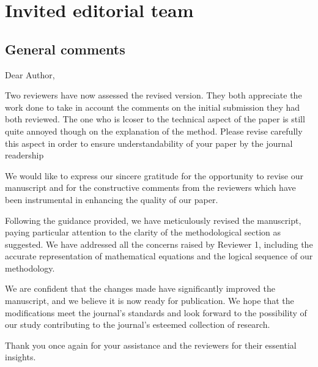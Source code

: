 \section*{Invited editorial team}\label{editor}

\subsection*{General comments}
\RC{} Dear Author,

\RC*{} Two reviewers have now assessed the revised version. They both appreciate the work done to take in account the comments on the initial submission they had both reviewed. The one who is lcoser to the technical aspect of the paper is still quite annoyed though on the explanation of the method. Please revise carefully this aspect in order to ensure understandability of your paper by the journal readership

\AR{} We would like to express our sincere gratitude for the opportunity to revise our manuscript and for the constructive comments from the reviewers which have been instrumental in enhancing the quality of our paper.

\AR*{} Following the guidance provided, we have meticulously revised the manuscript, paying particular attention to the clarity of the methodological section as suggested. We have addressed all the concerns raised by Reviewer 1, including the accurate representation of mathematical equations and the logical sequence of our methodology.

\AR*{} We are confident that the changes made have significantly improved the manuscript, and we believe it is now ready for publication. We hope that the modifications meet the journal’s standards and look forward to the possibility of our study contributing to the journal's esteemed collection of research.

\AR*{} Thank you once again for your assistance and the reviewers for their essential insights.

